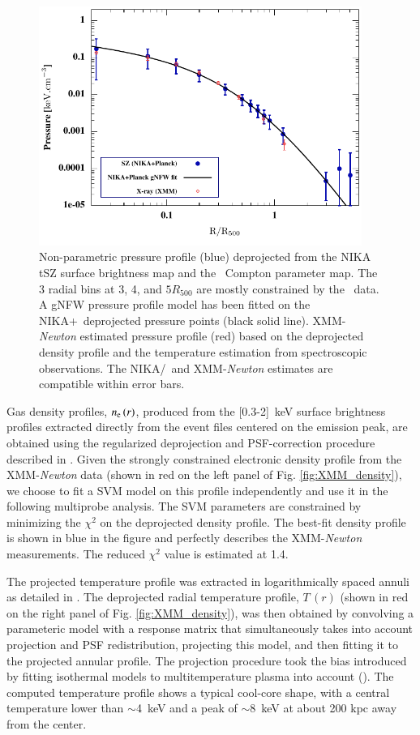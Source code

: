 \documentclass[traditabstract]{aa}
\begin{document}
\begin{figure}[h]
\center
\includegraphics[height=7.8cm]{Pressurenonparam.pdf}
\caption{{\footnotesize Non-parametric pressure profile (blue) deprojected from the NIKA tSZ surface brightness map and the \planck\ Compton parameter map. The 3 radial bins at 3, 4, and $5R_{500}$ are mostly constrained by the \planck\ data. A gNFW pressure profile model has been fitted on the NIKA+\planck\ deprojected pressure points (black solid line). XMM-{\it Newton} estimated pressure profile (red) based on the deprojected density profile and the temperature estimation from spectroscopic observations. The NIKA/\planck\ and XMM-{\it Newton} estimates are compatible within error bars.}}
\label{fig:Pressure_XMM_NIKA_Planck}
\end{figure}

Gas density profiles, $n_{\rm e}\,(r)$, produced from the [0.3-2]~keV surface brightness profiles extracted directly from the event files centered on the emission peak, are obtained using the regularized deprojection and PSF-correction procedure described in \citealt{cro06}. Given the strongly constrained electronic density profile from the XMM-{\it Newton} data (shown in red on the left panel of Fig. \ref{fig:XMM_density}), we choose to fit a SVM model on this profile independently and use it in the following multiprobe analysis. The SVM parameters are constrained by minimizing the $\chi^2$ on the deprojected density profile. The best-fit density profile is shown in blue in the figure and perfectly describes the XMM-{\it Newton} measurements. The reduced $\chi^2$ value is estimated at  1.4.

The projected temperature profile was extracted in logarithmically spaced annuli as detailed in \citealt{entropy_REXCESS}. The deprojected radial temperature profile, $T\,(r)$ (shown in red on the right panel of Fig. \ref{fig:XMM_density}), was then obtained by convolving a parameteric model with a response matrix that simultaneously takes into account projection and PSF redistribution, projecting this model, and then fitting it to the projected annular profile. The projection procedure took the bias introduced by fitting isothermal models to multitemperature plasma  into account  (\citealt{maz04, gamma_val}). The computed temperature profile shows a typical cool-core shape, with a central temperature lower than $\sim$4~keV and a peak of $\sim$8~keV at about 200 kpc away from the center.
\end{document}
